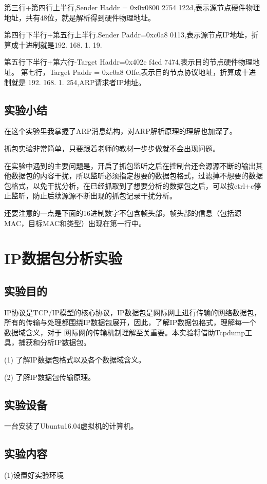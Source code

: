 \documentclass[lang=cn,11pt,a4paper,cite=authoryear]{elegantpaper}
\begin{document}
第三行+第四行上半行,Sender Haddr = 0x0x0800 2754 122d,表示源节点硬件物理地址，共有48位，就是解析得到硬件物理地址。

第四行下半行+第五行上半行.Sender Paddr=0xc0a8 0113,表示源节点IP地址，折算成十进制就是192. 168. 1. 19.

第五行下半行+第六行-Target Haddr=0x402c f4cd 7474,表示目的节点硬件物理地址。 第七行，Target Paddr = 0xc0a8 Olfe,表示目的节点协议地址，折算成十进制就是 192. 168. 1. 254,ARP请求者IP地址。


\subsection{实验小结}
在这个实验里我掌握了ARP消息结构，对ARP解析原理的理解也加深了。

抓包实验非常简单，只要跟着老师的教材一步步做就不会出现问题。

在实验中遇到的主要问题是，开启了抓包监听之后在控制台还会源源不断的输出其他数据包的内容干扰，所以监听必须指定想要的数据包格式，过滤掉不想要的数据包格式，以免干扰分析，在已经抓取到了想要分析的数据包之后，可以按ctrl+c停止监听，防止后续源源不断出现的抓包记录干扰分析。

还要注意的一点是下面的16进制数字不包含帧头部，帧头部的信息（包括源MAC，目标MAC和类型）出现在第一行中。

\section{IP数据包分析实验}
\subsection{实验目的}

IP协议是TCP/IP模型的核心协议，IP数据包是网际网上进行传输的网络数据包，所有的传输与处理都围绕IP数据包展开，因此，了解IP数据包格式，理解每一个数据域含义，对于 网际网的传输机制理解至关重要。本实验将借助Tcpdump工具，捕获和分析IP数据包。

(1)	了解IP数据包格式以及各个数据域含义。

(2)	了解IP数据包传输原理。

\subsection{实验设备}

一台安装了Ubuntu16.04虚拟机的计算机。

\subsection{实验内容}
(1)设置好实验环境
\end{document}
